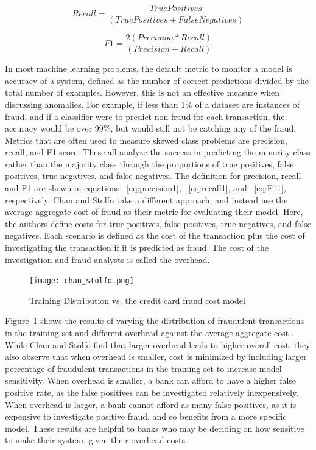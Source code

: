\documentclass[midd]{thesis}
\begin{document}
\begin{equation}
\label{eq:recall1}
    Recall = \frac{True Positives}{ (True Positives + False Negatives)}
\end{equation}

\begin{equation}
\label{eq:F11}
    F1 = \frac{2 (Precision * Recall)} {(Precision + Recall)}
\end{equation}

In most machine learning problems, the default metric to monitor a model is accuracy of a system, defined as the number of correct predictions divided by the total number of examples. However, this is not an effective measure when discussing anomalies. For example, if less than 1\% of a dataset are instances of fraud, and if a classifier were to predict non-fraud for each transaction, the accuracy would be over 99\%, but would still not be catching any of the fraud. Metrics that are often used to measure skewed class problems are precision, recall, and F1 score. These all analyze the success in predicting the minority class rather than the majority class through the proportions of true positives, false positives, true negatives, and false negatives.  The definition for precision, recall and F1 are shown in equations ~\ref{eq:precision1}, ~\ref{eq:recall1}, and ~\ref{eq:F11}, respectively. Chan and Stolfo take a different approach, and instead use the average aggregate cost of fraud as their metric for evaluating their model. Here, the authors define costs for true positives, false positives, true negatives, and false negatives. Each scenario is defined as the cost of the transaction plus the cost of investigating the transaction if it is predicted as fraud. The cost of the investigation and fraud analysts is called the overhead. 

\begin{figure}
  \texttt{[image: chan\_stolfo.png]}
  \caption{Training Distribution vs. the credit card fraud cost model \cite{Chan}}
  \label{fig:chan}
\end{figure}


Figure~\ref{fig:chan} shows the results of varying the distribution of fraudulent transactions in the training set and different overhead against the average aggregate cost \cite{Chan}. While Chan and Stolfo find that larger overhead leads to higher overall cost, they also observe that when overhead is smaller, cost is minimized by including larger percentage of fraudulent transactions in the training set to increase model sensitivity. When overhead is smaller, a bank can afford to have a higher false positive rate, as the false positives can be investigated relatively inexpensively. When overhead is larger, a bank cannot afford as many false positives, as it is expensive to investigate positive fraud, and so benefits from a more specific model. These results are helpful to banks who may be deciding on how sensitive to make their system, given their overhead costs.
\end{document}
